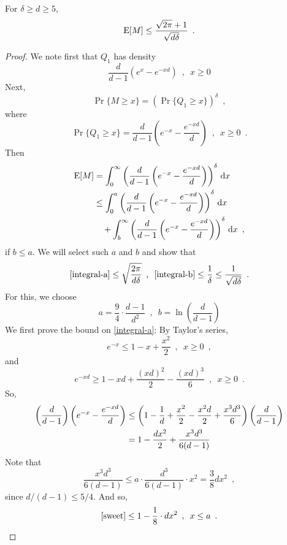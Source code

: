 \documentclass{patmorin}
\begin{document}
\begin{lem}
   For $\delta\ge d \ge 5$, 
   \[  \mathrm{E}[M] \le \frac{\sqrt{2\pi} + 1}{\sqrt{d\delta}} \enspace . \]
\end{lem}

\begin{proof}
   We note first that $Q_1$ has density
   \[
        \frac{d}{d-1}\left(e^x - e^{-xd}\right) \enspace , \enspace x\ge 0
   \]
   Next,
   \[
        \Pr\{M \ge x\} = \left(\Pr\{Q_1\ge x\}\right)^{\delta} \enspace ,
   \]
   where 
   \[
        \Pr\{Q_1\ge x\} = \frac{d}{d-1}\left(e^{-x}-\frac{e^{-xd}}{d}\right) \enspace ,\enspace x\ge 0 \enspace .
   \]
   Then
   \begin{align}
       \E[M] 
        & = \int_0^\infty \left(\frac{d}{d-1}\left(e^{-x}-\frac{e^{-xd}}{d}\right)\right)^\delta \,\mathrm{d}x \notag \\ 
        & \le
          \int_0^a \left(\frac{d}{d-1}\left(e^{-x}-\frac{e^{-xd}}{d}\right)\right)^\delta \,\mathrm{d}x  \eqlabel{integral-a} \\
          & \quad + \int_b^\infty \left(\frac{d}{d-1}\left(e^{-x}-\frac{e^{-xd}}{d}\right)\right)^\delta \,\mathrm{d}x \enspace , \eqlabel{integral-b}
   \end{align}
   if $b\le a$.  We will select such $a$ and $b$ and show that 
   \[  \eqref{integral-a} \le \sqrt{\frac{2\pi}{d\delta}} \enspace , \enspace
       \eqref{integral-b} \le \frac{1}{\delta} \le \frac{1}{\sqrt{d\delta}} \enspace .
   \]
   For this, we choose 
   \[
        a = \frac{9}{4}\cdot\frac{d-1}{d^2} \enspace, \enspace b=\ln\left(\frac{d}{d-1}\right)
   \]
   We first prove the bound on \eqref{integral-a}:  By Taylor's series, 
   \[   e^{-x} \le 1 - x + \frac{x^2}{2} \enspace , \enspace x\ge 0 \enspace , \]
   and
   \[   e^{-xd} \ge 1 - xd + \frac{(xd)^2}{2} - \frac{(xd)^3}{6}\enspace , \enspace x\ge 0 \enspace . \]
   So,
   \begin{align}
       \left(\frac{d}{d-1}\right)\left(e^{-x}-\frac{e^{-xd}}{d}\right)
       & \le 
       \left(
         1-\frac{1}{d}+\frac{x^2}{2}-\frac{x^2d}{2}+\frac{x^3d^3}{6}
       \right) \left(\frac{d}{d-1}\right) \notag \\
       & = 1-\frac{dx^2}{2}+\frac{x^3d^3}{6(d-1)}  \eqlabel{sweet}
   \end{align}
   Note that
   \[
         \frac{x^3d^3}{6(d-1)} \le a\cdot \frac{d^3}{6(d-1)}\cdot x^2
      = \frac{3}{8}dx^2 
      \enspace ,
   \] 
   since $d/(d-1) \le 5/4$. And so,
   \[
      \eqref{sweet} \le 1-\frac{1}{8}\cdot dx^2 \enspace , \enspace x \le a \enspace .
\]
\end{proof}
\end{document}
